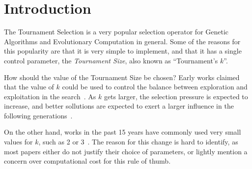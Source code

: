 \section{Introduction}\label{intro}


The Tournament Selection is a very popular selection operator for
Genetic Algorithms and Evolutionary Computation in general. Some of
the reasons for this popularity are that it is very simple to
implement, and that it has a single control parameter, the
\emph{Tournament Size}, also known as ``Tournament's $k$''.

How should the value of the Tournament Size be chosen? Early works
claimed that the value of $k$ could be used to control the balance
between exploration and exploitation in the
search~\cite{blickle1995mathematical}. As $k$ gets larger, the
selection pressure is expected to increase, and better sollutions are
expected to exert a larger influence in the following
generations~\cite{miller1995genetic}.

On the other hand, works in the past 15 years have commonly used very
small values for $k$, such as 2 or
3~\cite{deb2000efficient,beyer2001self,
  kaelo2007integrated,bhunia2009application,nicolau2009application,
  sawyerr2011comparative,sawyerr2015benchmarking}. The reason for this
change is hard to identify, as most papers either do not justify their
choice of parameters, or lightly mention a concern over computational
cost for this rule of thumb.



